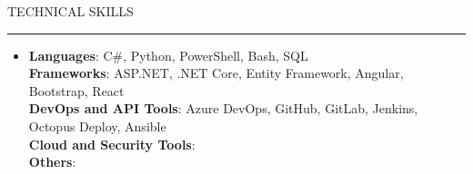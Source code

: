 \documentclass[letterpaper,10pt]{article}
\newcommand{\subheadingtitlevspace}{\vspace{-3pt}}
\newcommand{\titleItem}[1]{\textbf{#1}}
\newcommand{\ResumeSection}[1]{\par{\fontsize{11pt}{13pt}\selectfont \MakeUppercase{#1}}\vspace{1pt}\hrule height 0.6pt}
\newcommand{\SectionContentGap}{}
\begin{document}
\ResumeSection{Technical Skills}\vspace{-4pt}
\subheadingtitlevspace
\begin{itemize}[leftmargin=0.15in, label={}]
  \item{\titleItem{Languages}{: C\#, Python, PowerShell, Bash, SQL} \\
        \titleItem{Frameworks}{: ASP.NET, .NET Core, Entity Framework, Angular, Bootstrap, React} \\
        \titleItem{DevOps and API Tools}{: Azure DevOps, GitHub, GitLab, Jenkins, Octopus Deploy, Ansible} \\
        \titleItem{Cloud and Security Tools}{: } \\
        \titleItem{Others}{: }}
\end{itemize}
\SectionContentGap
\end{document}
